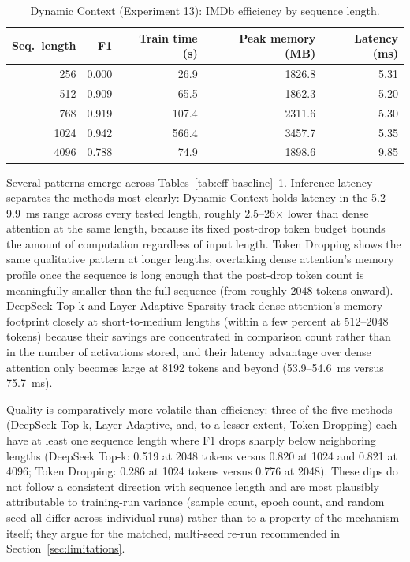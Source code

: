 \documentclass[11pt]{article}
\begin{document}
\begin{table}[ht]
  \centering
  \small
  \caption{Dynamic Context (Experiment 13): IMDb efficiency by sequence
  length.}
  \label{tab:eff-dynamiccontext}
  \begin{tabular}{@{}rrrrr@{}}
    \toprule
    Seq.\ length & F1 & Train time (s) & Peak memory (MB) & Latency (ms) \\
    \midrule
    256    & 0.000 & 26.9  & 1826.8 & 5.31 \\
    512    & 0.909 & 65.5  & 1862.3 & 5.20 \\
    768    & 0.919 & 107.4 & 2311.6 & 5.30 \\
    1024   & 0.942 & 566.4 & 3457.7 & 5.35 \\
    4096   & 0.788 & 74.9  & 1898.6 & 9.85 \\
    \bottomrule
  \end{tabular}
\end{table}

Several patterns emerge across Tables~\ref{tab:eff-baseline}--\ref{tab:eff-dynamiccontext}.
Inference latency separates the methods most clearly: Dynamic Context holds
latency in the 5.2--9.9~ms range across every tested length, roughly
2.5--26$\times$ lower than dense attention at the same length, because its
fixed post-drop token budget bounds the amount of computation regardless of
input length. Token Dropping shows the same qualitative pattern at longer
lengths, overtaking dense attention's memory profile once the sequence is long
enough that the post-drop token count is meaningfully smaller than the full
sequence (from roughly 2048 tokens onward). DeepSeek Top-k and Layer-Adaptive
Sparsity track dense attention's memory footprint closely at short-to-medium
lengths (within a few percent at 512--2048 tokens) because their savings are
concentrated in comparison count rather than in the number of activations
stored, and their latency advantage over dense attention only becomes large
at 8192 tokens and beyond (53.9--54.6~ms versus 75.7~ms).

Quality is comparatively more volatile than efficiency: three of the five
methods (DeepSeek Top-k, Layer-Adaptive, and, to a lesser extent, Token
Dropping) each have at least one sequence length where F1 drops sharply below
neighboring lengths (DeepSeek Top-k: 0.519 at 2048 tokens versus 0.820 at 1024
and 0.821 at 4096; Token Dropping: 0.286 at 1024 tokens versus 0.776 at 2048).
These dips do not follow a consistent direction with sequence length and are
most plausibly attributable to training-run variance (sample count, epoch
count, and random seed all differ across individual runs) rather than to a
property of the mechanism itself; they argue for the matched, multi-seed
re-run recommended in Section~\ref{sec:limitations}.
\end{document}
